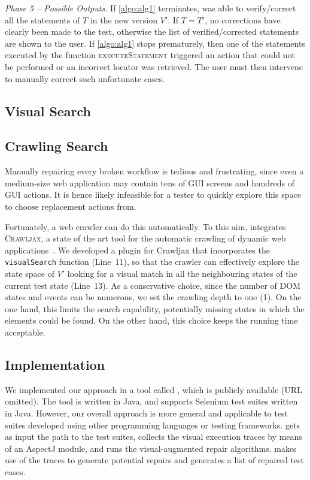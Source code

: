 \textit{Phase 5 -- Possible Outputs.}
If \autoref{algo:alg1} terminates, \tool was able to verify/correct all the statements of $T$ in the new version $V'$. If $T = T'$, no corrections have clearly been made to the test, otherwise the list of verified/corrected statements are shown to the user.
If \autoref{algo:alg1} stops prematurely, then one of the statements executed by the function \textsc{executeStatement} triggered an action that could not be performed or an incorrect locator was retrieved. The user must then intervene to manually correct such unfortunate cases.



\subsection{Visual Search}

\subsection{Crawling Search}

Manually repairing every broken workflow is tedious and frustrating, since even a medium-size web application may contain tens of GUI screens and hundreds of GUI actions. It is hence likely infeasible for a tester to quickly explore this space to choose replacement actions from.

Fortunately, a web crawler can do this automatically. To this aim, \tool integrates \textsc{Crawljax}, a state of the art tool for the automatic crawling of dynamic web applications~\cite{mesbah:tweb12,mesbah:tse12}. We developed a plugin for Crawljax that incorporates the \texttt{visualSearch} function (Line~11), so that the crawler can effectively explore the state space of $V'$ looking for a visual match in all the neighbouring states of the current test state (Line~13). As a conservative choice, since the number of DOM states and events can be numerous, we set the crawling depth to one (1). On the one hand, this limits the search capability, potentially missing states in which the elements could be found. On the other hand, this choice keeps the running time acceptable.

\subsection{Implementation}\label{sec:implementation}

We implemented our approach in a tool called \tool, which is publicly available (URL omitted). 
The tool is written in Java, and supports Selenium test suites written in Java. However, our overall approach is more general and applicable to test suites developed using other programming languages or testing frameworks. 
\tool gets as input the path to the test suites, collects the visual execution traces by means of an AspectJ module, and runs the visual-augmented repair algorithms. 
\tool makes use of the traces to generate potential repairs and generates a list of repaired test cases.







